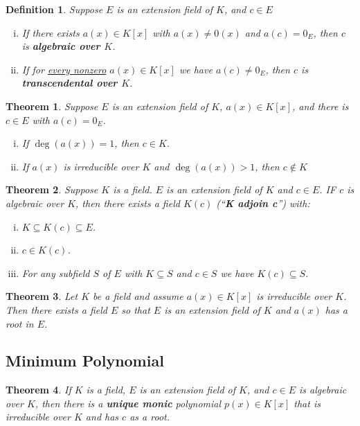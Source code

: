 \documentclass[letterpaper, 12pt]{article}
\newtheorem{defn}{Definition}
\newtheorem{thm}{Theorem}
\begin{document}
			\begin{defn}
			Suppose $E$ is an extension field of $K$, and $c \in E$
				\begin{enumerate}[(i)]
				\item If there exists $a(x) \in K[x]$ with $a(x) \neq 0(x)$ and $a(c) = 0_{E}$, then $c$ is \textbf{\textit{algebraic over $K$}}.
				\item If for \underline{every nonzero} $a(x) \in K[x]$ we have $a(c) \neq 0_{E}$, then $c$ is \textbf{\textit{transcendental over $K$}}.
				\end{enumerate}
			\end{defn}

			\setcounter{thm}{3}
			\begin{thm}
			Suppose $E$ is an extension field of $K$, $a(x) \in K[x]$, and there is $c \in E$ with $a(c) = 0_{E}$.
				\begin{enumerate}[(i)]
				\item If $\deg(a(x)) = 1$, then $c \in K$.
				\item If $a(x)$ is irreducible over $K$ and $\deg(a(x)) > 1$, then $c \not\in K$
				\end{enumerate}
			\end{thm}

			\begin{thm}
			Suppose $K$ is a field.
			$E$ is an extension field of $K$ and $c \in E$.
			IF $c$ is algebraic over $K$, then there exists a field $K(c)$ (``\textbf{K adjoin c}'') with:
				\begin{enumerate}[(i)]
				\item $K \subseteq K(c) \subseteq E$.
				\item $c \in K(c)$.
				\item For any subfield $S$ of $E$ with $K \subseteq S$ and $c \in S$ we have $K(c) \subseteq S$.
				\end{enumerate}
			\end{thm}

			\setcounter{thm}{6}
			\begin{thm}
			Let $K$ be a field and assume $a(x) \in K[x]$ is irreducible over $K$.
			Then there exists a field $E$ so that $E$ is an extension field of $K$ and $a(x)$ has a root in $E$.
			\end{thm}

		\subsection{Minimum Polynomial}
		\label{sec:minimum_polynomial}
			\setcounter{thm}{8}
			\begin{thm}
			If $K$ is a field, $E$ is an extension field of $K$, and $c \in E$ is algebraic over $K$, then there is a \textbf{\textit{unique monic}} polynomial $p(x) \in K[x]$ that is irreducible over $K$ and has $c$ as a root.
			\end{thm}
\end{document}
